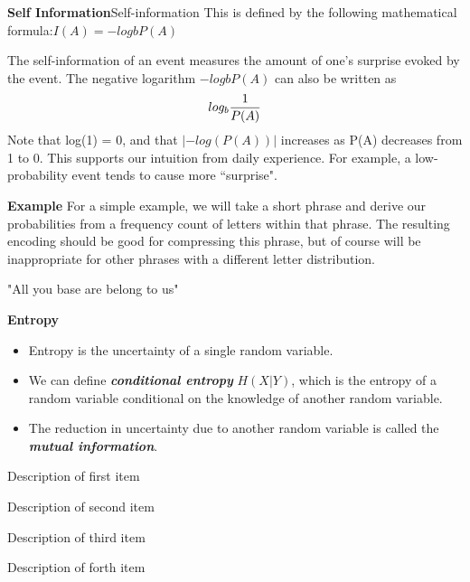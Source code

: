 \noindent \textbf{Self Information}Self-information
This is defined by the following mathematical formula:$I(A) = −logb P(A)$

The self-information of an event measures the amount of one's surprise
evoked by the event. The negative logarithm $−logb P(A)$ can also be written as \[
log_b  {1 \over P(A)} \]
Note that log(1) = 0, and that $| − log(P(A))|$ increases as P(A) decreases
from 1 to 0. This supports our intuition from daily experience. For example,
a low-probability event tends to cause more ``surprise".



{
\noindent \textbf{Example}
For a simple example, we will take a short phrase and derive our probabilities from a frequency count of letters within that phrase. The resulting encoding should be good for compressing this phrase, but of course will be inappropriate for other phrases with a different letter distribution.

"All you base are belong to us"
}


{
\noindent \textbf{Entropy}
\begin{itemize}
\item Entropy is the uncertainty of a single random variable. \item We can define \textbf{\emph{conditional entropy }}$H(X|Y)$, which is the entropy of a random variable
conditional on the knowledge of another random variable. \item The reduction in uncertainty due to another random variable is called the \textbf{\emph{mutual information}}.
\end{itemize}
}



{
\begin{description}
\item[First Item] Description of first item
\item[Second Item] Description of second item
\item[Third Item] Description of third item
\item[Forth Item] Description of forth item
\end{description}

}


